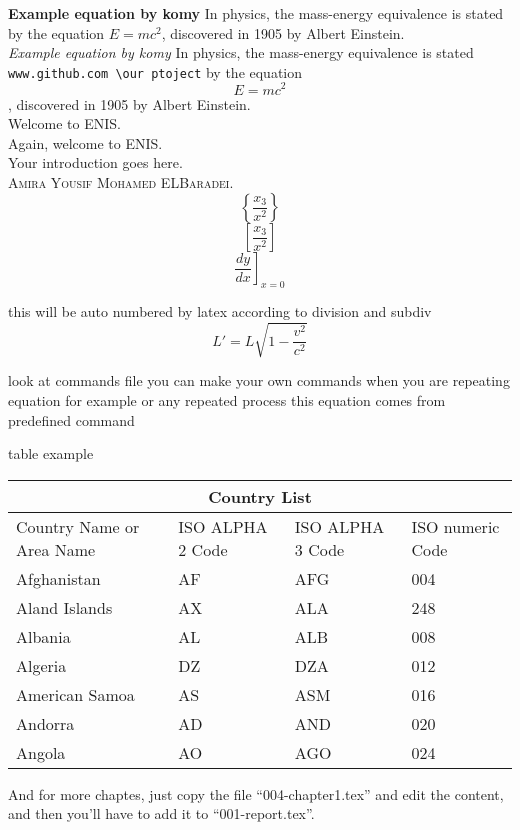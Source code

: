   

\textbf{Example equation by komy} In physics, the mass-energy equivalence is stated 
by the equation $E=mc^2$, discovered in 1905 by Albert Einstein.\\
\textit{Example equation by komy} In physics, the mass-energy equivalence is stated 
\texttt{www.github.com \textbackslash our ptoject}
by the equation $$E=mc^2$$, discovered in 1905 by Albert Einstein.\\
Welcome to \Ac{ENIS}.~\\
Again, welcome to \Ac{ENIS}. ~\\
Your introduction goes here. ~\\

\textsc{Amira Yousif Mohamed ELBaradei}.\\

$$\left\{\frac{x_3}{x^2}\right\}$$
$$\left[\frac{x_3}{x^2}\right]$$
$$\left.\frac{d y}{d x}\right]_{x=0}$$

this will be auto numbered by latex according to division and subdiv
\begin{equation}
L' = {L}{\sqrt{1-\frac{v^2}{c^2}}}
\end{equation}

look at commands file you can make your own commands when you are repeating equation for example or any repeated process 
this equation comes from predefined command
\komyCommand

table example\\
\begin{center}

\begin{tabular}{ |p{3cm}||p{3cm}|p{3cm}|p{3cm}|  }
 \hline
 \multicolumn{4}{|c|}{Country List} \\
 \hline
 
 Country Name     or Area Name& ISO ALPHA 2 Code &ISO ALPHA 3 Code&ISO numeric Code\\
 \hline
 Afghanistan   & AF    &AFG&   004\\
 Aland Islands&   AX  & ALA   &248\\
 Albania &AL & ALB&  008\\
 Algeria    &DZ & DZA&  012\\
 American Samoa&   AS  & ASM&016\\
 Andorra& AD  & AND   &020\\
 Angola& AO  & AGO&024\\
 \hline
\end{tabular}

\end{center}
And for more chaptes, just copy the file ``004-chapter1.tex'' and edit the content, and then you'll have to add it to ``001-report.tex''.

